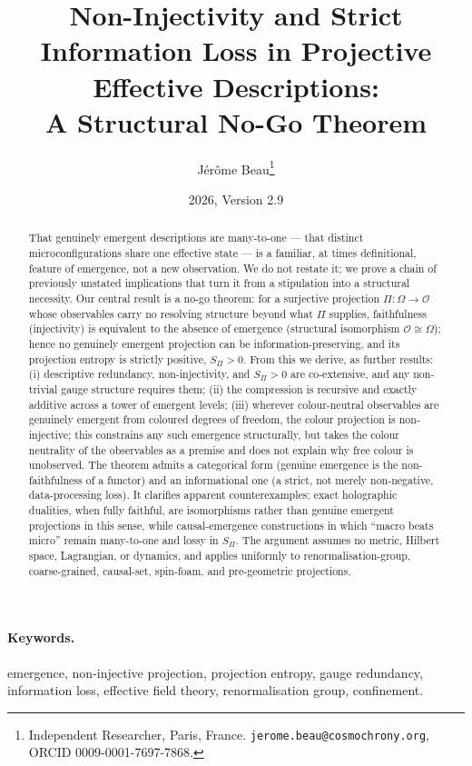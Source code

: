 \documentclass[12pt,a4paper]{article}
\title{Non-Injectivity and Strict Information Loss in Projective Effective Descriptions:\\
A Structural No-Go Theorem}
\author{J\'er\^ome Beau\thanks{Independent Researcher, Paris, France.
  \texttt{jerome.beau@cosmochrony.org}, ORCID 0009-0001-7697-7868.}}
\date{2026, Version 2.9}
\begin{document}
  \maketitle

  \begin{abstract}
    That genuinely emergent descriptions are many-to-one --- that distinct microconfigurations share one
    effective state --- is a familiar, at times definitional, feature of emergence, not a new observation.
    We do not restate it; we prove a chain of previously unstated implications that turn it from a stipulation
    into a structural necessity.
    Our central result is a no-go theorem: for a surjective projection $\Pi : \Omega \to \mathcal{O}$ whose
    observables carry no resolving structure beyond what $\Pi$ supplies, faithfulness (injectivity) is
    equivalent to the absence of emergence (structural isomorphism $\mathcal{O} \cong \Omega$); hence no
    genuinely emergent projection can be information-preserving, and its projection entropy is strictly
    positive, $S_\Pi > 0$.
    From this we derive, as further results: (i) descriptive redundancy, non-injectivity, and $S_\Pi > 0$ are
    co-extensive, and any non-trivial gauge structure requires them; (ii) the compression is recursive and
    exactly additive across a tower of emergent levels; (iii) wherever colour-neutral observables are genuinely
    emergent from coloured degrees of freedom, the colour projection is non-injective; this constrains any such
    emergence structurally, but takes the colour neutrality of the observables as a premise and does not explain
    why free colour is unobserved.
    The theorem admits a categorical form (genuine emergence is the non-faithfulness of a functor) and an
    informational one (a strict, not merely non-negative, data-processing loss).
    It clarifies apparent counterexamples: exact holographic dualities, when fully faithful, are isomorphisms
    rather than genuine emergent projections in this sense, while causal-emergence constructions in which
    ``macro beats micro'' remain many-to-one and lossy in $S_\Pi$.
    The argument assumes no metric, Hilbert space, Lagrangian, or dynamics, and applies uniformly to
    renormalisation-group, coarse-grained, causal-set, spin-foam, and pre-geometric projections.
  \end{abstract}

  \paragraph{Keywords.}
    emergence, non-injective projection, projection entropy, gauge redundancy, information loss,
    effective field theory, renormalisation group, confinement.
\end{document}
